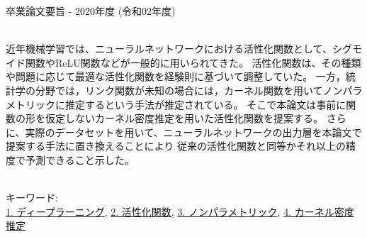 卒業論文要旨 - 2020年度 (令和02年度)
\begin{center}
\begin{large}
\end{large}
\end{center}

~ \\



近年機械学習では、ニューラルネットワークにおける活性化関数として、シグモイド関数やReLU関数などが一般的に用いられてきた。
活性化関数は、その種類や問題に応じて最適な活性化関数を経験則に基づいて調整していた。
一方，統計学の分野では，リンク関数が未知の場合には，カーネル関数を用いてノンパラメトリックに推定するという手法が推定されている。
そこで本論文は事前に関数の形を仮定しないカーネル密度推定を用いた活性化関数を提案する。
さらに、実際のデータセットを用いて、ニューラルネットワークの出力層を本論文で提案する手法に置き換えることにより
従来の活性化関数と同等かそれ以上の精度で予測できること示した。


~ \\
キーワード:\\
\underline{1. ディープラーニング},
\underline{2. 活性化関数},
\underline{3. ノンパラメトリック},
\underline{4. カーネル密度推定}
\begin{flushright}
\dept \\
\author
\end{flushright}
